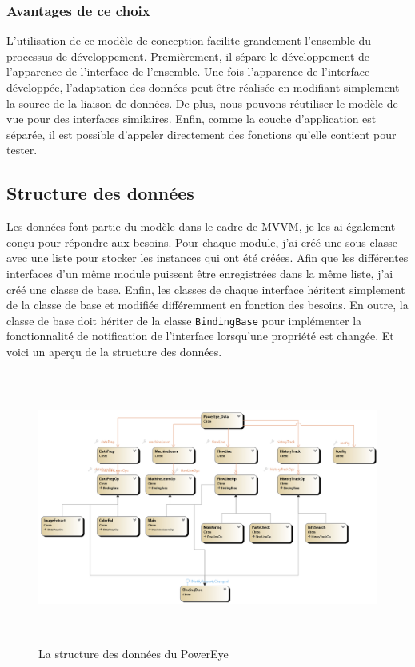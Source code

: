 \subsubsection{Avantages de ce choix}
L'utilisation de ce modèle de conception facilite grandement l'ensemble du processus de développement. Premièrement, il sépare le développement de l'apparence de l'interface de l'ensemble. Une fois l'apparence de l'interface développée, l'adaptation des données peut être réalisée en modifiant simplement la source de la liaison de données. De plus, nous pouvons réutiliser le modèle de vue pour des interfaces similaires. Enfin, comme la couche d'application est séparée, il est possible d'appeler directement des fonctions qu'elle contient pour tester.

\subsection{Structure des données}
Les données font partie du modèle dans le cadre de MVVM, je les ai également conçu pour répondre aux besoins. Pour chaque module, j'ai créé une sous-classe avec une liste pour stocker les instances qui ont été créées. Afin que les différentes interfaces d'un même module puissent être enregistrées dans la même liste, j'ai créé une classe de base. Enfin, les classes de chaque interface héritent simplement de la classe de base et modifiée différemment en fonction des besoins. En outre, la classe de base doit hériter de la classe \texttt{BindingBase} pour implémenter la fonctionnalité de notification de l'interface lorsqu'une propriété est changée. Et voici un aperçu de la structure des données.

\begin{figure}[H]
    \centering
    \includegraphics[height=9cm]{ressources/images/PowerEye_Data.png}
    \caption{La structure des données du PowerEye}
\end{figure}
